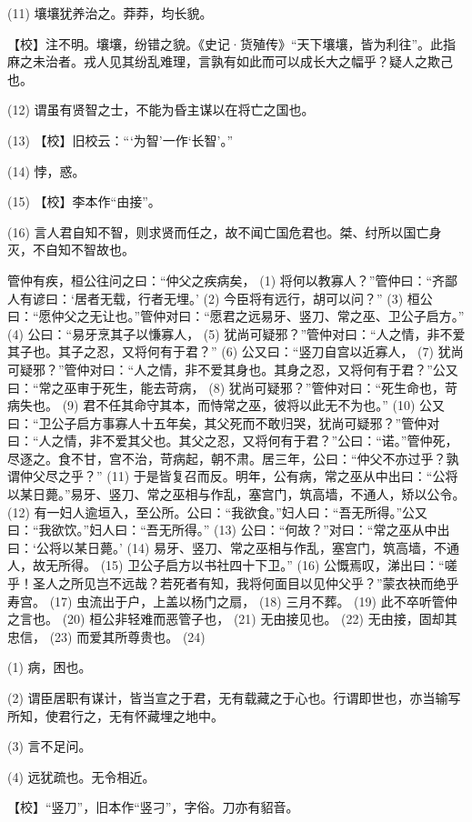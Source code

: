 \documentclass[12pt,UTF8]{ctexbook}
\begin{document}
(11) 壤壤犹养治之。莽莽，均长貌。

【校】注不明。壤壤，纷错之貌。《史记·货殖传》“天下壤壤，皆为利往”。此指麻之未治者。戎人见其纷乱难理，言孰有如此而可以成长大之幅乎？疑人之欺己也。

(12) 谓虽有贤智之士，不能为昏主谋以在将亡之国也。

(13) 【校】旧校云：“‘为智’一作‘长智’。”

(14) 悖，惑。

(15) 【校】李本作“由接”。

(16) 言人君自知不智，则求贤而任之，故不闻亡国危君也。桀、纣所以国亡身灭，不自知不智故也。

管仲有疾，桓公往问之曰：“仲父之疾病矣， (1) 将何以教寡人？”管仲曰：“齐鄙人有谚曰：‘居者无载，行者无埋。’ (2) 今臣将有远行，胡可以问？” (3) 桓公曰：“愿仲父之无让也。”管仲对曰：“愿君之远易牙、竖刀、常之巫、卫公子启方。” (4) 公曰：“易牙烹其子以慊寡人， (5) 犹尚可疑邪？”管仲对曰：“人之情，非不爱其子也。其子之忍，又将何有于君？” (6) 公又曰：“竖刀自宫以近寡人， (7) 犹尚可疑邪？”管仲对曰：“人之情，非不爱其身也。其身之忍，又将何有于君？”公又曰：“常之巫审于死生，能去苛病， (8) 犹尚可疑邪？”管仲对曰：“死生命也，苛病失也。 (9) 君不任其命守其本，而恃常之巫，彼将以此无不为也。” (10) 公又曰：“卫公子启方事寡人十五年矣，其父死而不敢归哭，犹尚可疑邪？”管仲对曰：“人之情，非不爱其父也。其父之忍，又将何有于君？”公曰：“诺。”管仲死，尽逐之。食不甘，宫不治，苛病起，朝不肃。居三年，公曰：“仲父不亦过乎？孰谓仲父尽之乎？” (11) 于是皆复召而反。明年，公有病，常之巫从中出曰：“公将以某日薨。”易牙、竖刀、常之巫相与作乱，塞宫门，筑高墙，不通人，矫以公令。 (12) 有一妇人逾垣入，至公所。公曰：“我欲食。”妇人曰：“吾无所得。”公又曰：“我欲饮。”妇人曰：“吾无所得。” (13) 公曰：“何故？”对曰：“常之巫从中出曰：‘公将以某日薨。’ (14) 易牙、竖刀、常之巫相与作乱，塞宫门，筑高墙，不通人，故无所得。 (15) 卫公子启方以书社四十下卫。” (16) 公慨焉叹，涕出曰：“嗟乎！圣人之所见岂不远哉？若死者有知，我将何面目以见仲父乎？”蒙衣袂而绝乎寿宫。 (17) 虫流出于户，上盖以杨门之扇， (18) 三月不葬。 (19) 此不卒听管仲之言也。 (20) 桓公非轻难而恶管子也， (21) 无由接见也。 (22) 无由接，固却其忠信， (23) 而爱其所尊贵也。 (24)

(1) 病，困也。

(2) 谓臣居职有谋计，皆当宣之于君，无有载藏之于心也。行谓即世也，亦当输写所知，使君行之，无有怀藏埋之地中。

(3) 言不足问。

(4) 远犹疏也。无令相近。

【校】“竖刀”，旧本作“竖刁”，字俗。刀亦有貂音。
\end{document}
